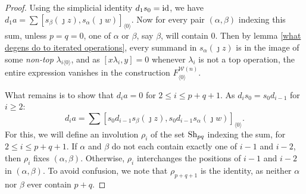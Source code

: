 \documentclass[11pt]{amsart}
\theoremstyle{plain}
\theoremstyle{definition}
\newcommand{\calw}{\mathcal{W}}
\theoremstyle{plain}
\newcommand{\Shuffles}[2]{\textup{Sh}_{#1#2}}
\newcommand{\Id}{\textup{id}}
\begin{document}
\begin{Koszul complexes}
\begin{proof}
Using the simplicial identity $d_1s_0=\Id$, we have $d_{1}a=\sum [s_\beta(\jmath z), s_\alpha(\jmath w)]_{\langle 0\rangle}$. Now for every pair $(\alpha,\beta)$ indexing this sum, unless $p=q=0$, one of $\alpha$ or $\beta$, say $\beta$, will contain $0$. Then by lemma \ref{what degens do to iterated operations}, every summand in $s_{\alpha}(\jmath z)$ is in the image of some \emph{non-top} $\lambda_{i\langle 0\rangle}$, and as $[x\lambda_i,y]=0$ whenever $\lambda_i$ is not a top operation, the entire expression vanishes in the construction $F^{\calw(n)}_{\langle 0\rangle}$.

What remains is to show that $d_{i}a=0$ for $2\leq i\leq p+q+1$. As $d_is_0=s_0d_{i-1}$ for $i\geq2$:
\[d_{i}a=\sum [s_{0}d_{i-1}s_\beta(\jmath z), s_{0}d_{i-1}s_\alpha(\jmath w)]_{\langle 0\rangle}.\]
For this, we will define an involution $\rho_i$ of the set $\Shuffles{p}{q}$ indexing the sum, for $2\leq i\leq p+q+1$.
If $\alpha$ and $\beta$ do not each contain exactly one of $i-1$ and $i-2$, then $\rho_i$ fixes $(\alpha,\beta)$. Otherwise, $\rho_i$ interchanges the positions of $i-1$ and $i-2$ in $(\alpha,\beta)$. To avoid confusion, we note that $\rho_{p+q+1}$ is the identity, as neither $\alpha$ nor $\beta$ ever contain $p+q$.


\end{proof}
\end{Koszul complexes}
\end{document}
